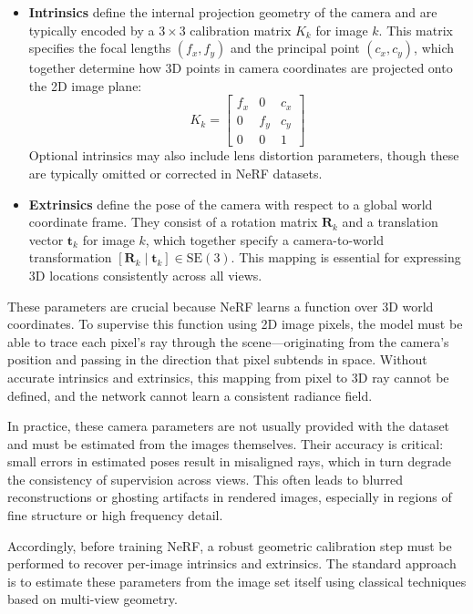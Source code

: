 \begin{itemize}
    \item \textbf{Intrinsics} define the internal projection geometry of the camera and are typically encoded by a \( 3 \times 3 \) calibration matrix \( K_k \) for image \( k \). This matrix specifies the focal lengths \((f_x, f_y)\) and the principal point \((c_x, c_y)\), which together determine how 3D points in camera coordinates are projected onto the 2D image plane:
    \[
    K_k =
    \begin{bmatrix}
        f_x & 0 & c_x \\
        0 & f_y & c_y \\
        0 & 0 & 1
    \end{bmatrix}
    \]
    Optional intrinsics may also include lens distortion parameters, though these are typically omitted or corrected in NeRF datasets.
    
    \item \textbf{Extrinsics} define the pose of the camera with respect to a global world coordinate frame. They consist of a rotation matrix \(\mathbf{R}_k\) and a translation vector \(\mathbf{t}_k\) for image \(k\), which together specify a camera-to-world transformation \([\mathbf{R}_k \mid \mathbf{t}_k] \in \mathrm{SE}(3)\). This mapping is essential for expressing 3D locations consistently across all views.
\end{itemize}

These parameters are crucial because NeRF learns a function over 3D world coordinates. To supervise this function using 2D image pixels, the model must be able to trace each pixel’s ray through the scene—originating from the camera’s position and passing in the direction that pixel subtends in space. Without accurate intrinsics and extrinsics, this mapping from pixel to 3D ray cannot be defined, and the network cannot learn a consistent radiance field.

In practice, these camera parameters are not usually provided with the dataset and must be estimated from the images themselves. Their accuracy is critical: small errors in estimated poses result in misaligned rays, which in turn degrade the consistency of supervision across views. This often leads to blurred reconstructions or ghosting artifacts in rendered images, especially in regions of fine structure or high frequency detail.

Accordingly, before training NeRF, a robust geometric calibration step must be performed to recover per-image intrinsics and extrinsics. The standard approach is to estimate these parameters from the image set itself using classical techniques based on multi-view geometry.


